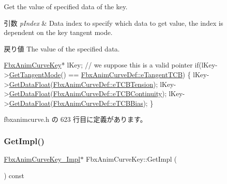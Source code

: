 Get the value of specified data of the key. 
\begin{DoxyParams}{引数}
{\em p\+Index} & Data index to specify which data to get value, the index is dependent on the key tangent mode. \\
\hline
\end{DoxyParams}
\begin{DoxyReturn}{戻り値}
The value of the specified data.
\end{DoxyReturn}

\begin{DoxyCode}
\hyperlink{class_fbx_anim_curve_key}{FbxAnimCurveKey}* lKey; \textcolor{comment}{// we suppose this is a valid pointer}
\textcolor{keywordflow}{if}(lKey->\hyperlink{class_fbx_anim_curve_key_a3821c01c7e1b422efcf2fedd074ffb6a}{GetTangentMode}() == \hyperlink{class_fbx_anim_curve_def_ac810ccc5ca0527704ab5175479964b87ae9d885e8a384fd9165123ac47a661dd8}{FbxAnimCurveDef::eTangentTCB})
\{
    lKey->\hyperlink{class_fbx_anim_curve_key_a3185c35241a072105f14327afd275452}{GetDataFloat}(\hyperlink{class_fbx_anim_curve_def_a3be261d961f8226235529b148cf80300a38129a423990a42f94187b77ab041caa}{FbxAnimCurveDef::eTCBTension});
    lKey->\hyperlink{class_fbx_anim_curve_key_a3185c35241a072105f14327afd275452}{GetDataFloat}(\hyperlink{class_fbx_anim_curve_def_a3be261d961f8226235529b148cf80300a5544ce65720f37d5a2620dc32556b2ba}{FbxAnimCurveDef::eTCBContinuity});
    lKey->\hyperlink{class_fbx_anim_curve_key_a3185c35241a072105f14327afd275452}{GetDataFloat}(\hyperlink{class_fbx_anim_curve_def_a3be261d961f8226235529b148cf80300a4ed5dbb6b725478205a3c750c20790d3}{FbxAnimCurveDef::eTCBBias});
\}
\end{DoxyCode}
 

 fbxanimcurve.\+h の 623 行目に定義があります。

\mbox{\label{class_fbx_anim_curve_key_a21427b9606e3bb19b87f1bda1197a5eb}} 
\subsubsection{\texorpdfstring{Get\+Impl()}{GetImpl()}}
{\footnotesize\ttfamily \hyperlink{class_fbx_anim_curve_key___impl}{Fbx\+Anim\+Curve\+Key\+\_\+\+Impl}$\ast$ Fbx\+Anim\+Curve\+Key\+::\+Get\+Impl (\begin{DoxyParamCaption}{ }\end{DoxyParamCaption}) const\hspace{0.3cm}{\ttfamily [inline]}}


